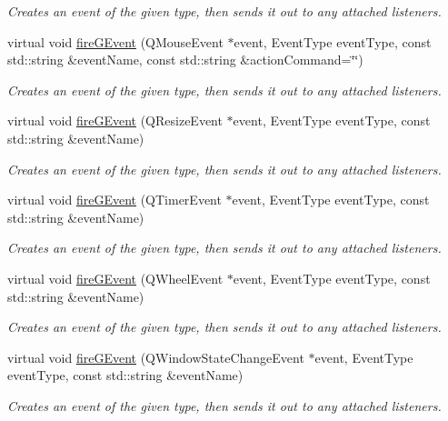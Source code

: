 \begin{DoxyCompactItemize}
\begin{DoxyCompactList}\small\item\em Creates an event of the given type, then sends it out to any attached listeners. \end{DoxyCompactList}\item 
virtual void \mbox{\hyperlink{classGObservable_a119318675d2165bdf7dd853aaf881d4b}{fire\+G\+Event}} (Q\+Mouse\+Event $\ast$event, Event\+Type event\+Type, const std\+::string \&event\+Name, const std\+::string \&action\+Command=\char`\"{}\char`\"{})
\begin{DoxyCompactList}\small\item\em Creates an event of the given type, then sends it out to any attached listeners. \end{DoxyCompactList}\item 
virtual void \mbox{\hyperlink{classGObservable_a63fd9034e1e1633c1c38eb342bfd34e9}{fire\+G\+Event}} (Q\+Resize\+Event $\ast$event, Event\+Type event\+Type, const std\+::string \&event\+Name)
\begin{DoxyCompactList}\small\item\em Creates an event of the given type, then sends it out to any attached listeners. \end{DoxyCompactList}\item 
virtual void \mbox{\hyperlink{classGObservable_a741345310d9b7c5170a6cbc410c44ac4}{fire\+G\+Event}} (Q\+Timer\+Event $\ast$event, Event\+Type event\+Type, const std\+::string \&event\+Name)
\begin{DoxyCompactList}\small\item\em Creates an event of the given type, then sends it out to any attached listeners. \end{DoxyCompactList}\item 
virtual void \mbox{\hyperlink{classGObservable_a93bf338968a0338761b8e4dc62f582e9}{fire\+G\+Event}} (Q\+Wheel\+Event $\ast$event, Event\+Type event\+Type, const std\+::string \&event\+Name)
\begin{DoxyCompactList}\small\item\em Creates an event of the given type, then sends it out to any attached listeners. \end{DoxyCompactList}\item 
virtual void \mbox{\hyperlink{classGObservable_a2a70a7d7435ff0c3b80bb4d70da19e0d}{fire\+G\+Event}} (Q\+Window\+State\+Change\+Event $\ast$event, Event\+Type event\+Type, const std\+::string \&event\+Name)
\begin{DoxyCompactList}\small\item\em Creates an event of the given type, then sends it out to any attached listeners. \end{DoxyCompactList}\item 

\end{DoxyCompactItemize}
